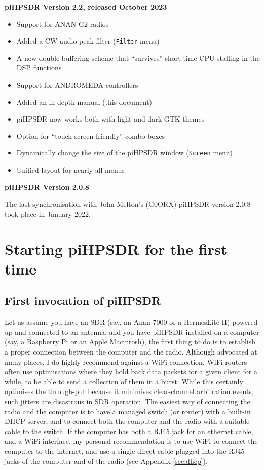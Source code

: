 \documentclass[12pt]{book}
\def\bltt#1{\texttt{\color{blue}#1}}
\def\pH{pi\-HPSDR\xspace}
\begin{document}
\medskip
\textbf{\pH Version 2.2, released October 2023}
\begin{itemize}
\item{Support for ANAN-G2 radios}
\item{Added a CW audio peak filter (\bltt{Filter} menu)}
\item{A new double-buffering scheme that ``survives'' short-time CPU stalling in the DSP functions}
\item{Support for ANDROMEDA controllers}
\item{Added an in-depth manual (this document)}
\item{\pH now works both with light and dark GTK themes}
\item{Option for ``touch screen friendly'' combo-boxes}
\item{Dynamically change the size  of the \pH window (\bltt{Screen} menu)}
\item{Unified layout for nearly all menus}
\end{itemize}

\medskip
\textbf{\pH Version 2.0.8}

\smallskip
The last synchronisation with John Melton's (G0ORX) \pH version 2.0.8 took place in January 2022.
\chapter{Starting \pH for the first time}
\section{First invocation of \pH}
Let us assume you have an SDR (say, an Anan-7000 or a HermesLite-II) powered up and connected to an antenna,
and you have \pH installed on a computer (say, a Raspberry Pi or an Apple Macintosh), the first thing to
do is to establish a proper connection between the computer and the radio. Although advocated at many
places,
I do highly recommend against a WiFi connection. WiFi routers often use optimisations where they hold
back data packets for a given client for a while, to be able to send a collection of them in a burst. While
this certainly optimises the through-put because it minimises clear-channel arbitration events, such jitters
are disastrous in SDR operation. The easiest way of connecting the radio and the computer is to have a
managed switch (or router) with a built-in DHCP server, and to connect both the computer and the radio with a suitable
cable to the switch. If the computer has both a RJ45 jack for an ethernet cable, and a WiFi interface, my
personal recommendation is to use WiFi to connect the computer to the internet, and use a single direct
cable plugged
into the RJ45 jacks of the computer and of the radio (see Appendix
\ref{sec:dhcp}).
\end{document}

